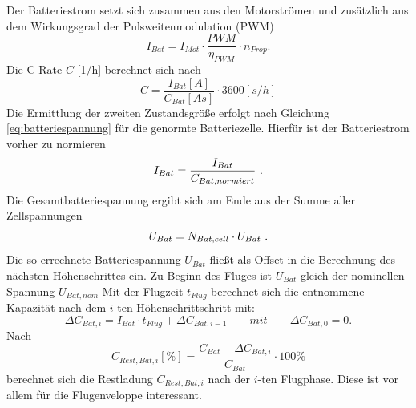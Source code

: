 Der Batteriestrom setzt sich zusammen aus den Motorströmen und zusätzlich aus dem Wirkungsgrad der Pulsweitenmodulation (PWM)
\begin{equation}
	I_{Bat} = I_{Mot}\cdot \frac{PWM}{\eta_{PWM}}\cdot n_{Prop}.  \label{eq:batteriestrom}
\end{equation}
Die C-Rate \ensuremath{\dot{C}} [1/h] berechnet sich nach 
\begin{equation}
	\dot{C} = \frac{I_{Bat}[A]}{C_{Bat}[As]}\cdot 3600[s/h]
	\label{eq:c_rate}
\end{equation}
Die Ermittlung der zweiten Zustandsgröße erfolgt nach Gleichung \ref{eq:batteriespannung} für die genormte Batteriezelle. Hierfür ist der Batteriestrom vorher zu normieren
\begin{equation}
	I_{Bat} = \frac{I_{Bat}}{C_{Bat,normiert}} ~\text{.}
\end{equation}
Die Gesamtbatteriespannung ergibt sich am Ende aus der Summe aller Zellspannungen
\begin{equation}
	U_{Bat} = N_{Bat,cell}\cdot U_{Bat} ~\text{.}
\end{equation}
Die so errechnete Batteriespannung \ensuremath{U_{Bat}} fließt als Offset in die Berechnung des nächsten Höhenschrittes ein. Zu Beginn des Fluges ist \ensuremath{U_{Bat}} gleich der nominellen Spannung \ensuremath{U_{Bat,nom}}
Mit der Flugzeit \ensuremath{t_{Flug}} berechnet sich die entnommene Kapazität nach dem \ensuremath{i}-ten Höhenschrittschritt mit: 
\begin{equation}
	\Delta C_{Bat,i} = I_{Bat}\cdot t_{Flug} + \Delta C_{Bat,i-1} 
	\qquad mit \qquad \Delta C_{Bat,0} = 0.
\end{equation}
Nach
\begin{equation}
	C_{Rest,Bat,i}[\%] = \frac{C_{Bat}-\Delta C_{Bat,i}}{C_{Bat}}\cdot 100\%
\end{equation}
berechnet sich die Restladung \ensuremath{C_{Rest,Bat,i}} nach der \ensuremath{i}-ten Flugphase. Diese ist vor allem für die Flugenveloppe interessant.\\




